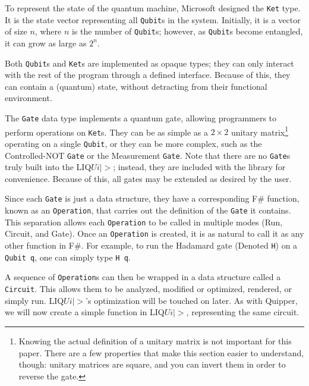 \documentclass[]{article}
\begin{document}
To represent the state of the quantum machine, Microsoft designed the \texttt{Ket} type. It is the state vector representing all \texttt{Qubit}s in the system. Initially, it is a vector of size $n$, where $n$ is the number of \texttt{Qubit}s; however, as \texttt{Qubit}s become entangled, it can grow as large as $2^n$.

Both \texttt{Qubit}s and \texttt{Ket}s are implemented as opaque types; they can only interact with the rest of the program through a defined interface. Because of this, they can contain a (quantum) state, without detracting from their functional environment.

The \texttt{Gate} data type implements a quantum gate, allowing programmers to perform operations on \texttt{Ket}s. They can be as simple as a $2 \times 2$ unitary matrix\footnote{Knowing the actual definition of a unitary matrix is not important for this paper. There are a few properties that make this section easier to understand, though: unitary matrices are square, and you can invert them in order to reverse the gate.} operating on a single \texttt{Qubit}, or they can be more complex, such as the Controlled-NOT \texttt{Gate} or the Measurement \texttt{Gate}. Note that there are no \texttt{Gate}s truly built into the LIQ$Ui|>$; instead, they are included with the library for convenience. Because of this, all gates may be extended as desired by the user.

Since each \texttt{Gate} is just a data structure, they have a corresponding F\# function, known as an \texttt{Operation}, that carries out the definition of the \texttt{Gate} it contains. This separation allows each \texttt{Operation} to be called in multiple modes (Run, Circuit, and Gate). Once an \texttt{Operation} is created, it is as natural to call it as any other function in F\#. For example, to run the Hadamard gate (Denoted \texttt{H}) on a \texttt{Qubit q}, one can simply type \texttt{H q}.

A sequence of \texttt{Operation}s can then be wrapped in a data structure called a \texttt{Circuit}. This allows them to be analyzed, modified or optimized, rendered, or simply run. LIQ$Ui|>$'s optimization will be touched on later. As with Quipper, we will now create a simple function in LIQ$Ui|>$, representing the same circuit.
\end{document}
